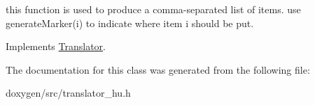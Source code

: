 this function is used to produce a comma-\/separated list of items. use generate\+Marker(i) to indicate where item i should be put. 

Implements \mbox{\hyperlink{class_translator}{Translator}}.



The documentation for this class was generated from the following file\+:\begin{DoxyCompactItemize}
\item 
doxygen/src/translator\+\_\+hu.\+h\end{DoxyCompactItemize}
